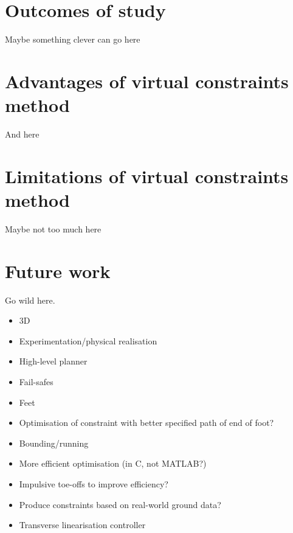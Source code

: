 \section{Outcomes of study}
Maybe something clever can go here

\section{Advantages of virtual constraints method}
And here

\section{Limitations of virtual constraints method}
Maybe not too much here

\section{Future work}
Go wild here.

\begin{itemize}
	\item 3D
	\item Experimentation/physical realisation
	\item High-level planner
	\item Fail-safes
	\item Feet
	\item Optimisation of constraint with better specified path of end of foot?
	\item Bounding/running
	\item More efficient optimisation (in C, not MATLAB?)
	\item Impulsive toe-offs to improve efficiency?
	\item Produce constraints based on real-world ground data?
	\item Transverse linearisation controller
\end{itemize}